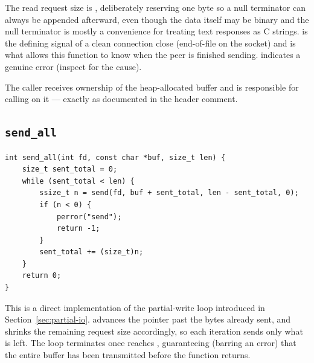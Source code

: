 The read request size is , deliberately reserving one byte so a null terminator can always be appended afterward, even though the data itself may be binary and the null terminator is mostly a convenience for treating text responses as C strings.  is the defining signal of a clean connection close (end-of-file on the socket) and is what allows this function to know when the peer is finished sending.  indicates a genuine error (inspect  for the cause).

The caller receives ownership of the heap-allocated buffer and is responsible for calling  on it --- exactly as documented in the header comment.

\subsection{\texttt{send\_all}}

\begin{lstlisting}[style=cstyle]
int send_all(int fd, const char *buf, size_t len) {
    size_t sent_total = 0;
    while (sent_total < len) {
        ssize_t n = send(fd, buf + sent_total, len - sent_total, 0);
        if (n < 0) {
            perror("send");
            return -1;
        }
        sent_total += (size_t)n;
    }
    return 0;
}
\end{lstlisting}

This is a direct implementation of the partial-write loop introduced in Section~\ref{sec:partial-io}.  advances the pointer past the bytes already sent, and  shrinks the remaining request size accordingly, so each iteration sends only what is left. The loop terminates once  reaches , guaranteeing (barring an error) that the entire buffer has been transmitted before the function returns.
